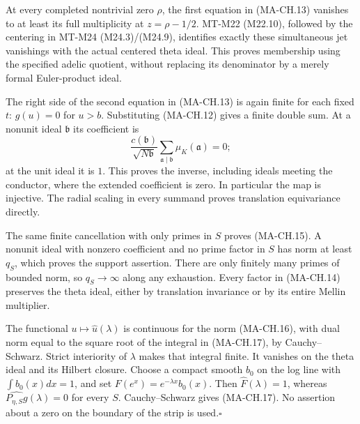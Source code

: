 At every completed nontrivial zero $\rho$, the first equation
in (MA-CH.13) vanishes to at least its full multiplicity at
$z=\rho-1/2$.  MT-M22 (M22.10), followed by the centering
in MT-M24 (M24.3)/(M24.9), identifies exactly these simultaneous
jet vanishings with the actual centered theta ideal.
This proves membership using the specified adelic quotient,
without replacing its denominator by a merely formal
Euler-product ideal.

The right side of the second equation in (MA-CH.13) is again
finite for each fixed $t$: $g(u)=0$ for $u>b$.
Substituting (MA-CH.12) gives a finite double sum.  At a
nonunit ideal $\mathfrak b$ its coefficient is
\[
   \frac{c(\mathfrak b)}{\sqrt{N\mathfrak b}}
                         \sum_{\mathfrak a\mid\mathfrak b}
                                           \mu_K(\mathfrak a)=0;
\]
at the unit ideal it is $1$.  This proves the inverse,
including ideals meeting the conductor, where the extended
coefficient is zero.  In particular the map is injective.
The radial scaling in every summand proves translation
equivariance directly.

The same finite cancellation with only primes in $S$ proves
(MA-CH.15).  A nonunit ideal with nonzero coefficient and
no prime factor in $S$ has norm at least $q_S$, which proves
the support assertion.  There are only finitely many primes
of bounded norm, so $q_S\to\infty$ along any exhaustion.
Every factor in (MA-CH.14) preserves the theta ideal, either
by translation invariance or by its entire Mellin multiplier.

The functional $u\mapsto\widehat u(\lambda)$ is continuous
for the norm (MA-CH.16), with dual norm equal to the square
root of the integral in (MA-CH.17), by Cauchy--Schwarz.
Strict interiority of $\lambda$ makes that integral finite.
It vanishes on the theta ideal and its Hilbert closure.
Choose a compact smooth $b_0$ on the log line with
$\int b_0(x)dx=1$, and set
$F(e^x)=e^{-\lambda x}b_0(x)$.  Then
$\widehat F(\lambda)=1$, whereas
$\widehat{P_{\eta,S}g}(\lambda)=0$ for every $S$.
Cauchy--Schwarz gives (MA-CH.17).  No assertion about a zero
on the boundary of the strip is used.\hfill$\square$

